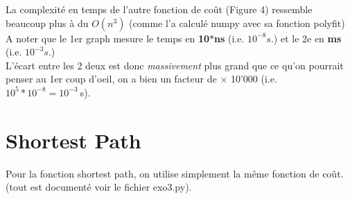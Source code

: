 \documentclass[french]{article}
\begin{document}
\begin{enumerate}
La complexité en temps de l'autre fonction de coût (Figure 4) ressemble beaucoup plus à du $O(n^3)$ (comme l'a calculé numpy avec sa fonction polyfit) \\ 
A noter que le 1er graph mesure le temps en \textbf{10$*$ns} (i.e. \( 10^{-8} s\).) et le 2e en \textbf{ms} (i.e. \( 10^{-3} s\).)\\
L'écart entre les 2 deux est donc \textit{massivement} plus grand que ce qu'on pourrait penser au 1er coup d'oeil, on a bien un facteur de $\times$ 10'000 (i.e. \( 10^5 * 10^{-8} = 10^{-3}\ \)s).


\section{Shortest Path}

Pour la fonction shortest path, on utilise simplement la même fonction de coût. (tout est documenté voir le fichier exo3.py).



\end{enumerate}
%
%


%
%
\end{document}
